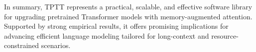 \documentclass[10pt,a4paper]{article}
\begin{document}
In summary, TPTT represents a practical, scalable, and effective software library for upgrading pretrained Transformer models with memory-augmented attention. Supported by strong empirical results, it offers promising implications for advancing efficient language modeling tailored for long-context and resource-constrained scenarios.




\end{document}

